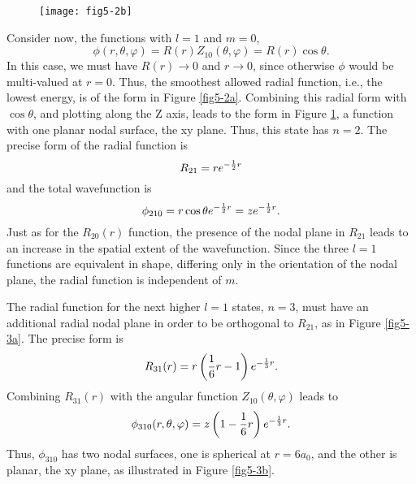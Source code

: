 \begin{figure}
\begin{center}
\texttt{[image: fig5-2b]}
\end{center}
\caption{}
\label{fig5-2b}
\end{figure}

Consider now, the functions with $l = 1$ and $m = 0$,
\begin{equation}
\phi ( r , \theta , \varphi ) = R ( r ) Z_{10} ( \theta , \varphi ) = R 
(r) \cos \theta .
\end{equation}
In this case, we must have $R(r) \rightarrow 0$ and $r \rightarrow 0$,
since otherwise $\phi$ would be multi-valued at $r = 0$.  Thus, the
smoothest allowed radial function, i.e., the lowest energy, is of the
form in Figure \ref{fig5-2a}.
Combining this radial form with $\cos \theta$, and plotting along the
Z axis, leads to the form in Figure \ref{fig5-2b}, a function with one
planar nodal surface, the xy plane.  Thus, this state has $n = 2$.
The precise form of the radial function is
\begin{equation}
R_{21} = re^{-{1 \over 2}r}
\end{equation}
and the total wavefunction is
\begin{equation}
\phi_{210} = r \cos \theta e^{-{1 \over 2}r} = ze^{-{1 \over 2}r}.
\end{equation}
Just as for the $R_{20}(r)$ function, the presence of the nodal plane in 
$R_{21}$ leads to an increase in the spatial extent of the wavefunction. 
Since the three $l = 1$ functions are equivalent in shape, differing only 
in the orientation of the nodal plane, the radial function is
independent of $m$.

The radial function for the next higher $l = 1$ states, $n = 3$, must have 
an additional radial nodal plane in order to be orthogonal to $R_{21}$, as 
in Figure \ref{fig5-3a}.  The precise form is
\begin{equation}
R_{31} (r) = r \left( {1 \over 6} r - 1 \right) e^{-{1 \over 3}r}.
\end{equation}
Combining $R_{31}(r)$ with the angular function $Z_{10} (\theta , \varphi)$ 
leads to
\begin{equation}
\phi_{310} ( r , \theta , \varphi ) = z \left( 1 - {1 \over 6} r \right) 
e^{-{1 \over 3}r}.
\end{equation}
Thus, $\phi_{310}$ has two nodal surfaces, one is spherical at $r = 
6a_0$, 
and the other is planar, the xy plane, as illustrated in Figure \ref{fig5-3b}.


